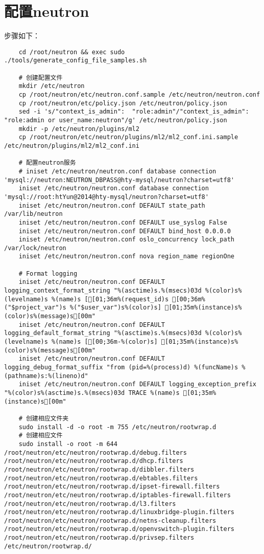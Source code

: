 \documentclass[a4paper,left=1.5cm,right=1.5cm,11pt]{article}
\begin{document}
\section{配置neutron}
	步骤如下：
	\begin{lstlisting}
	cd /root/neutron && exec sudo ./tools/generate_config_file_samples.sh
	
	# 创建配置文件
	mkdir /etc/neutron
	cp /root/neutron/etc/neutron.conf.sample /etc/neutron/neutron.conf
	cp /root/neutron/etc/policy.json /etc/neutron/policy.json
	sed -i 's/"context_is_admin":  "role:admin"/"context_is_admin":  "role:admin or user_name:neutron"/g' /etc/neutron/policy.json
	mkdir -p /etc/neutron/plugins/ml2
	cp /root/neutron/etc/neutron/plugins/ml2/ml2_conf.ini.sample /etc/neutron/plugins/ml2/ml2_conf.ini

	# 配置neutron服务
	# iniset /etc/neutron/neutron.conf database connection 'mysql://neutron:NEUTRON_DBPASS@hty-mysql/neutron?charset=utf8'
	iniset /etc/neutron/neutron.conf database connection 'mysql://root:htYun@2014@hty-mysql/neutron?charset=utf8'
	iniset /etc/neutron/neutron.conf DEFAULT state_path /var/lib/neutron
	iniset /etc/neutron/neutron.conf DEFAULT use_syslog False
	iniset /etc/neutron/neutron.conf DEFAULT bind_host 0.0.0.0
	iniset /etc/neutron/neutron.conf oslo_concurrency lock_path /var/lock/neutron
	iniset /etc/neutron/neutron.conf nova region_name regionOne

	# Format logging
	iniset /etc/neutron/neutron.conf DEFAULT logging_context_format_string "%(asctime)s.%(msecs)03d %(color)s%(levelname)s %(name)s [[01;36m%(request_id)s [00;36m%("$project_var")s %("$user_var")s%(color)s] [01;35m%(instance)s%(color)s%(message)s[00m"
	iniset /etc/neutron/neutron.conf DEFAULT logging_default_format_string "%(asctime)s.%(msecs)03d %(color)s%(levelname)s %(name)s [[00;36m-%(color)s] [01;35m%(instance)s%(color)s%(message)s[00m"
	iniset /etc/neutron/neutron.conf DEFAULT logging_debug_format_suffix "from (pid=%(process)d) %(funcName)s %(pathname)s:%(lineno)d"
	iniset /etc/neutron/neutron.conf DEFAULT logging_exception_prefix "%(color)s%(asctime)s.%(msecs)03d TRACE %(name)s [01;35m%(instance)s[00m"

	# 创建相应文件夹
	sudo install -d -o root -m 755 /etc/neutron/rootwrap.d
	# 创建相应文件
	sudo install -o root -m 644 /root/neutron/etc/neutron/rootwrap.d/debug.filters /root/neutron/etc/neutron/rootwrap.d/dhcp.filters /root/neutron/etc/neutron/rootwrap.d/dibbler.filters /root/neutron/etc/neutron/rootwrap.d/ebtables.filters /root/neutron/etc/neutron/rootwrap.d/ipset-firewall.filters /root/neutron/etc/neutron/rootwrap.d/iptables-firewall.filters /root/neutron/etc/neutron/rootwrap.d/l3.filters /root/neutron/etc/neutron/rootwrap.d/linuxbridge-plugin.filters /root/neutron/etc/neutron/rootwrap.d/netns-cleanup.filters /root/neutron/etc/neutron/rootwrap.d/openvswitch-plugin.filters /root/neutron/etc/neutron/rootwrap.d/privsep.filters /etc/neutron/rootwrap.d/


\end{lstlisting}
\end{document}
